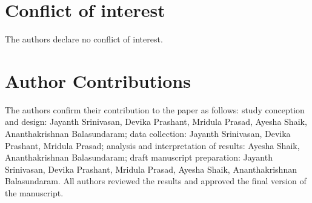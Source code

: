 \documentclass[utf8]{FrontiersinHarvard} %
\begin{document}
\section*{Conflict of interest}
The authors declare no conflict of interest.

\section*{Author Contributions}
The authors confirm their contribution to the paper as follows: study conception and design: Jayanth Srinivasan, Devika Prashant, Mridula Prasad, Ayesha Shaik, Ananthakrishnan Balasundaram; data collection: Jayanth Srinivasan, Devika Prashant, Mridula Prasad; analysis and interpretation of results: Ayesha Shaik, Ananthakrishnan Balasundaram; draft manuscript preparation: Jayanth Srinivasan, Devika Prashant, Mridula Prasad, Ayesha Shaik, Ananthakrishnan Balasundaram. All authors reviewed the results and approved the final version of the manuscript.






\end{document}
